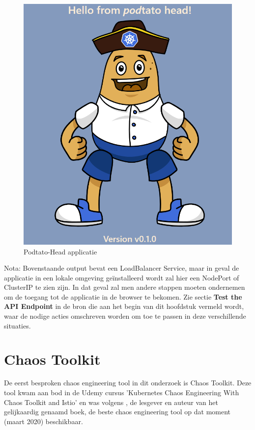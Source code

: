 \begin{figure}[h]
    \centering
    \includegraphics[scale=.5]{img/podtatohead-app.png}
    \caption{Podtato-Head applicatie}
    \label{img:podtato-head}
\end{figure}

Nota: Bovenstaande output bevat een LoadBalancer Service, maar in geval de applicatie in een lokale omgeving geïnstalleerd wordt zal hier een NodePort of ClusterIP te zien zijn. In dat geval zal men andere stappen moeten ondernemen om de toegang tot de applicatie in de browser te bekomen. 
Zie sectie {\bf Test the API Endpoint} in de bron die aan het begin van dit hoofdstuk vermeld wordt, waar de nodige acties omschreven worden om toe te passen in deze verschillende situaties.  

\section{Chaos Toolkit}

De eerst besproken chaos engineering tool in dit onderzoek is Chaos Toolkit. Deze tool kwam aan bod in de Udemy cursus 'Kubernetes Chaos Engineering With Chaos Toolkit and Istio' en was volgens \textcite{Viktor Farcic}, de lesgever en auteur van het gelijkaardig genaamd boek, de beste chaos engineering tool op dat moment (maart 2020) beschikbaar. 

